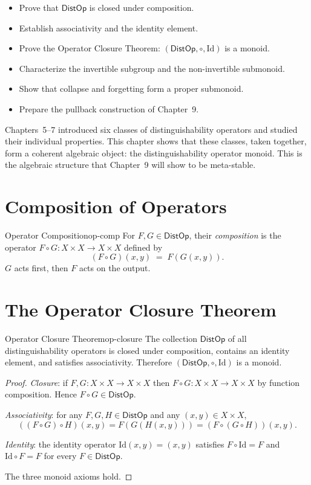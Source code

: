 \documentclass[12pt,twoside,openright]{book}
\newcommand{\distPairs}{X\times X}
\newcommand{\distOp}{\mathsf{DistOp}}
\newenvironment{objectives}{%
  \begin{tcolorbox}[colback=DistBlue!5,colframe=DistBlue,
    title={\faCheckCircle\enspace Chapter Objectives},
    fonttitle=\sffamily\bfseries\color{white},
    attach boxed title to top left={yshift=-2mm,xshift=4mm},
    boxed title style={colback=DistBlue},breakable]
  \begin{itemize}[leftmargin=*,nosep]}{%
  \end{itemize}\end{tcolorbox}\vspace{1em}}
\begin{document}
\begin{objectives}
\item Prove that $\distOp$ is closed under composition.
\item Establish associativity and the identity element.
\item Prove the Operator Closure Theorem: $(\distOp,\circ,
  \mathrm{Id})$ is a monoid.
\item Characterize the invertible subgroup and the
  non-invertible submonoid.
\item Show that collapse and forgetting form a proper
  submonoid.
\item Prepare the pullback construction of Chapter~9.
\end{objectives}

Chapters~5--7 introduced six classes of distinguishability
operators and studied their individual properties. This chapter
shows that these classes, taken together, form a coherent
algebraic object: the distinguishability operator monoid. This
is the algebraic structure that Chapter~9 will show to be
meta-stable.

\section{Composition of Operators}

\begin{definition}{Operator Composition}{op-comp}
For $F,G\in\distOp$, their \emph{composition} is the operator
$F\circ G:\distPairs\to\distPairs$ defined by
\[
  (F\circ G)(x,y) \;=\; F(G(x,y)).
\]
$G$ acts first, then $F$ acts on the output.
\end{definition}

\section{The Operator Closure Theorem}

\begin{theorem}{Operator Closure Theorem}{op-closure}
The collection $\distOp$ of all distinguishability operators
is closed under composition, contains an identity element,
and satisfies associativity. Therefore
$(\distOp,\circ,\mathrm{Id})$ is a monoid.
\begin{proof}
\emph{Closure}: if $F,G:\distPairs\to\distPairs$ then
$F\circ G:\distPairs\to\distPairs$ by function composition.
Hence $F\circ G\in\distOp$.

\emph{Associativity}: for any $F,G,H\in\distOp$ and any
$(x,y)\in\distPairs$,
\[
  ((F\circ G)\circ H)(x,y)
  = F(G(H(x,y)))
  = (F\circ(G\circ H))(x,y).
\]

\emph{Identity}: the identity operator $\mathrm{Id}(x,y)=(x,y)$
satisfies $F\circ\mathrm{Id}=F$ and $\mathrm{Id}\circ F=F$
for every $F\in\distOp$.

The three monoid axioms hold.
\end{proof}
\end{theorem}
\end{document}
